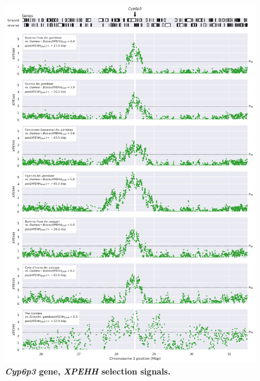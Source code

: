 \documentclass[a4paper,11pt,abstracton,hidelinks]{scrartcl}
\begin{document}
\begin{figure}[t!]
	\begin{center}
		\includegraphics*[width=1\linewidth,center]{artwork/locus_cyp6p3_xpehh_pdist.png}
	\end{center}
	\caption[\textit{Cyp6p3} gene, \textit{XPEHH} selection signals]{
	\textbf{\textit{Cyp6p3} gene, \textit{XPEHH} selection signals.}
	} 
	\label{fig:locus_cyp6p3_xpehh}
\end{figure}


\end{document}
